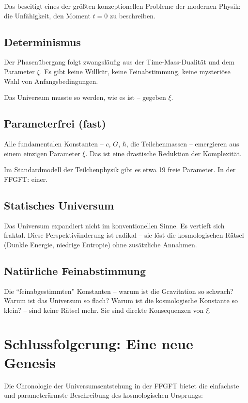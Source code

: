	Das beseitigt eines der größten konzeptionellen Probleme der modernen Physik: die Unfähigkeit, den Moment $t=0$ zu beschreiben.
	
	\subsection{Determinismus}
	
	Der Phasenübergang folgt zwangsläufig aus der Time-Mass-Dualität und dem Parameter $\xi$. Es gibt keine Willkür, keine Feinabstimmung, keine mysteriöse Wahl von Anfangsbedingungen.
	
	Das Universum musste so werden, wie es ist -- gegeben $\xi$.
	
	\subsection{Parameterfrei (fast)}
	
	Alle fundamentalen Konstanten -- $c$, $G$, $\hbar$, die Teilchenmassen -- emergieren aus einem einzigen Parameter $\xi$. Das ist eine drastische Reduktion der Komplexität.
	
	Im Standardmodell der Teilchenphysik gibt es etwa 19 freie Parameter. In der FFGFT: einer.
	
	\subsection{Statisches Universum}
	
	Das Universum expandiert nicht im konventionellen Sinne. Es vertieft sich fraktal. Diese Perspektivänderung ist radikal -- sie löst die kosmologischen Rätsel (Dunkle Energie, niedrige Entropie) ohne zusätzliche Annahmen.
	
	\subsection{Natürliche Feinabstimmung}
	
	Die \enquote{feinabgestimmten} Konstanten -- warum ist die Gravitation so schwach? Warum ist das Universum so flach? Warum ist die kosmologische Konstante so klein? -- sind keine Rätsel mehr. Sie sind direkte Konsequenzen von $\xi$.
	
	\section{Schlussfolgerung: Eine neue Genesis}
	
	Die Chronologie der Universumsentstehung in der FFGFT bietet die einfachste und parameterärmste Beschreibung des kosmologischen Ursprungs:
	
